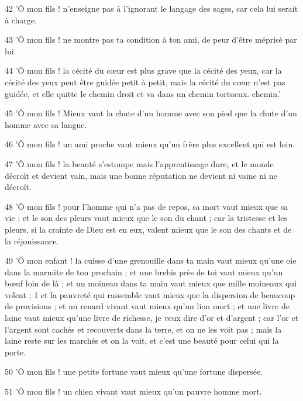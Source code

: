 \par 42 'Ô mon fils ! n'enseigne pas à l'ignorant le langage des sages, car cela lui serait à charge.

\par 43 'Ô mon fils ! ne montre pas ta condition à ton ami, de peur d'être méprisé par lui.

\par 44 'Ô mon fils ! la cécité du cœur est plus grave que la cécité des yeux, car la cécité des yeux peut être guidée petit à petit, mais la cécité du cœur n'est pas guidée, et elle quitte le chemin droit et va dans un chemin tortueux. chemin.'

\par 45 'Ô mon fils ! Mieux vaut la chute d'un homme avec son pied que la chute d'un homme avec sa langue.

\par 46 'Ô mon fils ! un ami proche vaut mieux qu'un frère plus excellent qui est loin.

\par 47 'Ô mon fils ! la beauté s'estompe mais l'apprentissage dure, et le monde décroît et devient vain, mais une bonne réputation ne devient ni vaine ni ne décroît.

\par 48 'Ô mon fils ! pour l'homme qui n'a pas de repos, sa mort vaut mieux que sa vie ; et le son des pleurs vaut mieux que le son du chant ; car la tristesse et les pleurs, si la crainte de Dieu est en eux, valent mieux que le son des chants et de la réjouissance.

\par 49 'Ô mon enfant ! la cuisse d'une grenouille dans ta main vaut mieux qu'une oie dans la marmite de ton prochain ; et une brebis près de toi vaut mieux qu'un bœuf loin de là ; et un moineau dans ta main vaut mieux que mille moineaux qui volent ; 1 et la pauvreté qui rassemble vaut mieux que la dispersion de beaucoup de provisions ; et un renard vivant vaut mieux qu'un lion mort ; et une livre de laine vaut mieux qu'une livre de richesse, je veux dire d'or et d'argent ; car l'or et l'argent sont cachés et recouverts dans la terre, et on ne les voit pas ; mais la laine reste sur les marchés et on la voit, et c'est une beauté pour celui qui la porte.

\par 50 'Ô mon fils ! une petite fortune vaut mieux qu'une fortune dispersée.

\par 51 'Ô mon fils ! un chien vivant vaut mieux qu'un pauvre homme mort.


